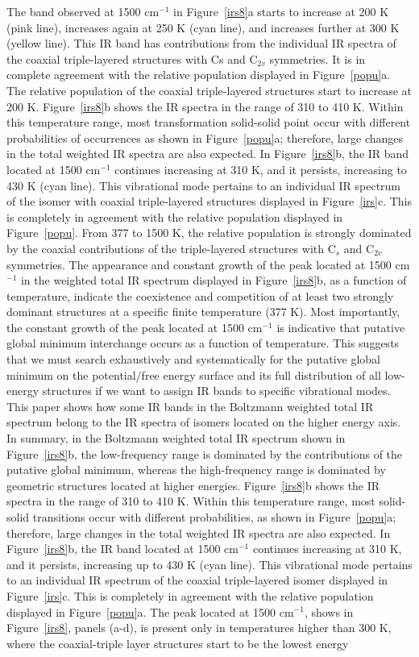 \documentclass[prb,aps,preprint,showkeys,showpacs]{revtex4}
\begin{document}
The band observed at 1500 cm$^{-1}$ in Figure~\ref{irs8}a starts to increase at 200 K (pink line), increases again at 250 K (cyan line), and increases further at 300 K (yellow line). This IR band has contributions from the individual IR spectra of the coaxial triple-layered structures with Cs and C$_{2v}$ symmetries. It is in complete agreement with the relative population displayed in Figure~\ref{popu}a. The relative population of the coaxial triple-layered structures start to increase at 200 K. Figure~\ref{irs8}b shows the IR spectra in the range of 310 to 410 K. Within this temperature range, most transformation solid-solid point occur with different probabilities of occurrences as shown in Figure~\ref{popu}a; therefore, large changes in the total weighted IR spectra are also expected. In Figure~\ref{irs8}b, the IR band located at 1500 cm$^{-1}$ continues increasing at 310 K, and it persists, increasing to 430 K (cyan line). This vibrational mode pertains to an individual IR spectrum of the isomer with coaxial triple-layered structures displayed in Figure~\ref{irs}c. This is completely in agreement with the relative population displayed in Figure~\ref{popu}. From 377 to 1500 K, the relative population is strongly dominated by the coaxial contributions of the triple-layered structures with C$_s$ and C$_{2v}$ symmetries. The appearance and constant growth of the peak located at 1500 cm$^{-1}$ in the weighted total IR spectrum displayed in Figure~\ref{irs8}b, as a function of temperature, indicate the coexistence and competition of at least two strongly dominant structures at a specific finite temperature (377 K). Most importantly, the constant growth of the peak located at 1500 cm$^{-1}$ is indicative that putative global minimum interchange occurs as a function of temperature. This suggests that we must search exhaustively and systematically for the putative global minimum on the potential/free energy surface and its full distribution of all low-energy structures if we want to assign IR bands to specific vibrational modes. This paper shows how some IR bands in the Boltzmann weighted total IR spectrum belong to the IR spectra of isomers located on the higher energy axis. In summary, in the Boltzmann weighted total IR spectrum shown in Figure~\ref{irs8}b, the low-frequency range is dominated by the contributions of the putative global minimum, whereas the high-frequency range is dominated by geometric structures located at higher energies. Figure~\ref{irs8}b shows the IR spectra in the range of 310 to 410 K. Within this temperature range, most solid-solid transitions occur with different probabilities, as shown in Figure~\ref{popu}a; therefore, large changes in the total weighted IR spectra are also expected. In Figure~\ref{irs8}b, the IR band located at 1500 cm$^{-1}$ continues increasing at 310 K, and it persists, increasing up to 430 K (cyan line). This vibrational mode pertains to an individual IR spectrum of the coaxial triple-layered isomer displayed in Figure~\ref{irs}c. This is completely in agreement with the relative population displayed in Figure~\ref{popu}a. The peak located at 1500 cm$^{-1}$, shows in Figure~\ref{irs8}, panels (a-d), is present only in temperatures higher than 300 K, where the coaxial-triple layer structures start to be the lowest energy 
\end{document}
